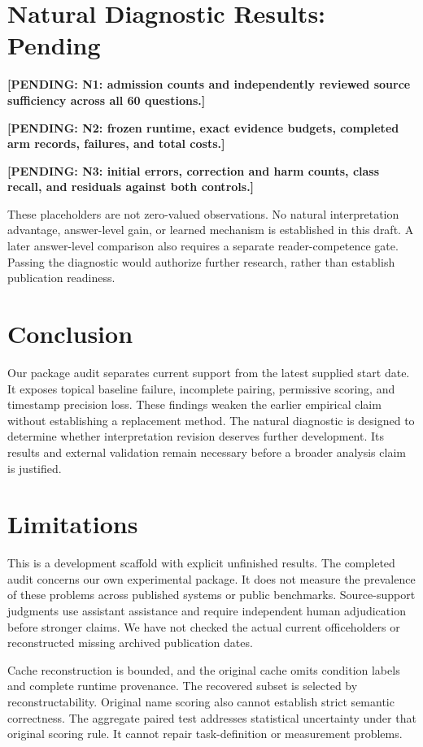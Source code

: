 \documentclass[11pt]{article}
\newcommand{\pending}[1]{\textbf{[PENDING: #1]}}
\begin{document}
\section{Natural Diagnostic Results: Pending}
\label{sec:pending}

\pending{N1: admission counts and independently reviewed source sufficiency across all 60 questions.}

\pending{N2: frozen runtime, exact evidence budgets, completed arm records, failures, and total costs.}

\pending{N3: initial errors, correction and harm counts, class recall, and residuals against both controls.}

These placeholders are not zero-valued observations.
No natural interpretation advantage, answer-level gain, or learned mechanism is established in this draft.
A later answer-level comparison also requires a separate reader-competence gate.
Passing the diagnostic would authorize further research, rather than establish publication readiness.

\section{Conclusion}

Our package audit separates current support from the latest supplied start date.
It exposes topical baseline failure, incomplete pairing, permissive scoring, and timestamp precision loss.
These findings weaken the earlier empirical claim without establishing a replacement method.
The natural diagnostic is designed to determine whether interpretation revision deserves further development.
Its results and external validation remain necessary before a broader analysis claim is justified.
\label{v26-main-end}

\clearpage
\section*{Limitations}

This is a development scaffold with explicit unfinished results.
The completed audit concerns our own experimental package.
It does not measure the prevalence of these problems across published systems or public benchmarks.
Source-support judgments use assistant assistance and require independent human adjudication before stronger claims.
We have not checked the actual current officeholders or reconstructed missing archived publication dates.

Cache reconstruction is bounded, and the original cache omits condition labels and complete runtime provenance.
The recovered subset is selected by reconstructability.
Original name scoring also cannot establish strict semantic correctness.
The aggregate paired test addresses statistical uncertainty under that original scoring rule.
It cannot repair task-definition or measurement problems.
\end{document}
